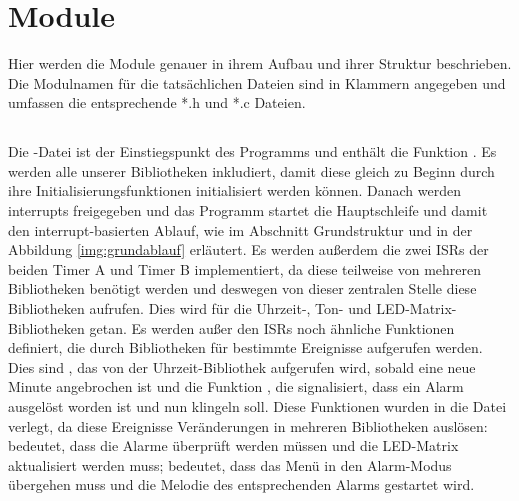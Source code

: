 \section{Module}
Hier werden die Module genauer in ihrem Aufbau und ihrer Struktur beschrieben. Die Modulnamen für die tatsächlichen Dateien sind in Klammern angegeben und umfassen die entsprechende *.h und *.c Dateien.

\subsection{}
Die -Datei ist der Einstiegspunkt des Programms und enthält die Funktion . Es werden alle unserer Bibliotheken inkludiert, damit diese gleich zu Beginn durch ihre Initialisierungsfunktionen initialisiert werden können. Danach werden interrupts freigegeben und das Programm startet die Hauptschleife und damit den interrupt-basierten Ablauf, wie im Abschnitt Grundstruktur und in der Abbildung \ref{img:grundablauf} erläutert.
\newline
Es werden außerdem die zwei ISRs der beiden Timer A und Timer B implementiert, da diese teilweise von mehreren Bibliotheken benötigt werden und deswegen von dieser zentralen Stelle diese Bibliotheken aufrufen. Dies wird für die Uhrzeit-, Ton- und LED-Matrix-Bibliotheken getan.
\newline
Es werden außer den ISRs noch ähnliche Funktionen definiert, die durch Bibliotheken für bestimmte Ereignisse aufgerufen werden. Dies sind , das von der Uhrzeit-Bibliothek aufgerufen wird, sobald eine neue Minute angebrochen ist und die Funktion , die signalisiert, dass ein Alarm ausgelöst worden ist und nun klingeln soll. Diese Funktionen wurden in die  Datei verlegt, da diese Ereignisse Veränderungen in mehreren Bibliotheken auslösen:  bedeutet, dass die Alarme überprüft werden müssen und die LED-Matrix aktualisiert werden muss;
 bedeutet, dass das Menü in den Alarm-Modus übergehen muss und die Melodie des entsprechenden Alarms gestartet wird.

